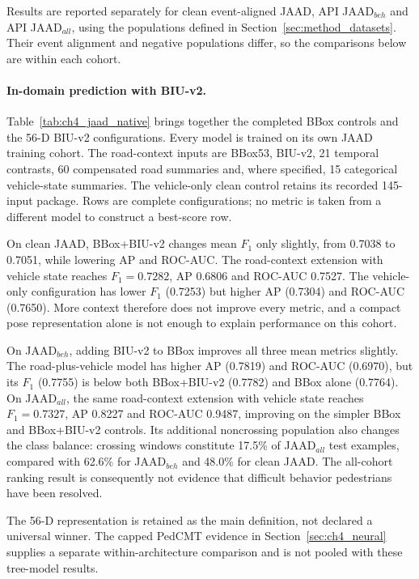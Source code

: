 Results are reported separately for clean event-aligned JAAD, API JAAD$_{beh}$ and
API JAAD$_{all}$, using the populations defined in Section~\ref{sec:method_datasets}.
Their event alignment and negative populations differ, so the comparisons below are
within each cohort.

\paragraph{In-domain prediction with BIU-v2.}
Table~\ref{tab:ch4_jaad_native} brings together the completed BBox controls and the
56-D BIU-v2 configurations. Every model is trained on its own JAAD training cohort.
The road-context inputs are BBox53, BIU-v2, 21 temporal contrasts, 60 compensated road
summaries and, where specified, 15 categorical vehicle-state summaries. The vehicle-only
clean control retains its recorded 145-input package. Rows are complete configurations;
no metric is taken from a different model to construct a best-score row.



On clean JAAD, BBox+BIU-v2 changes mean $F_1$ only slightly, from 0.7038 to 0.7051,
while lowering AP and ROC-AUC. The road-context extension with vehicle state reaches
$F_1=0.7282$, AP 0.6806 and ROC-AUC 0.7527. The vehicle-only configuration has
lower $F_1$ (0.7253) but higher AP (0.7304) and ROC-AUC (0.7650). More context
therefore does not improve every metric, and a compact pose representation alone is
not enough to explain performance on this cohort.

On JAAD$_{beh}$, adding BIU-v2 to BBox improves all three mean metrics slightly.
The road-plus-vehicle model has higher AP (0.7819) and ROC-AUC (0.6970), but its
$F_1$ (0.7755) is below both BBox+BIU-v2 (0.7782) and BBox alone (0.7764).
On JAAD$_{all}$, the same road-context extension with vehicle state reaches $F_1=0.7327$, AP 0.8227
and ROC-AUC 0.9487, improving on the simpler BBox and BBox+BIU-v2 controls.
Its additional noncrossing population also changes the class balance: crossing windows
constitute 17.5\% of JAAD$_{all}$ test examples, compared with 62.6\% for JAAD$_{beh}$
and 48.0\% for clean JAAD. The all-cohort ranking result is consequently not evidence
that difficult behavior pedestrians have been resolved.

The 56-D representation is retained as the main definition, not declared a universal winner.
The capped PedCMT evidence in Section~\ref{sec:ch4_neural} supplies a separate
within-architecture comparison and is not pooled with these tree-model results.

